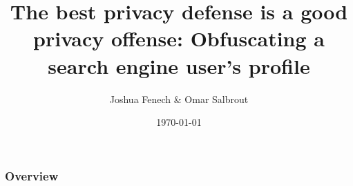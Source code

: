 \documentclass{beamer}
\title[The best privacy defense is a good privacy offense]{The best privacy defense is a good privacy offense: Obfuscating a search engine user’s profile} %
\author{Joshua Fenech \& Omar Salbrout} %
\institute[MLDM] %
{University of Jean Monnet \\ %
\medskip
\textit{jfenech22@hotmail.com} %
}
\date{\today} %
\begin{document}
\begin{frame}
\titlepage %
\end{frame}

\begin{frame}
\frametitle{Overview} %
\tableofcontents %
\end{frame}





\end{document}
